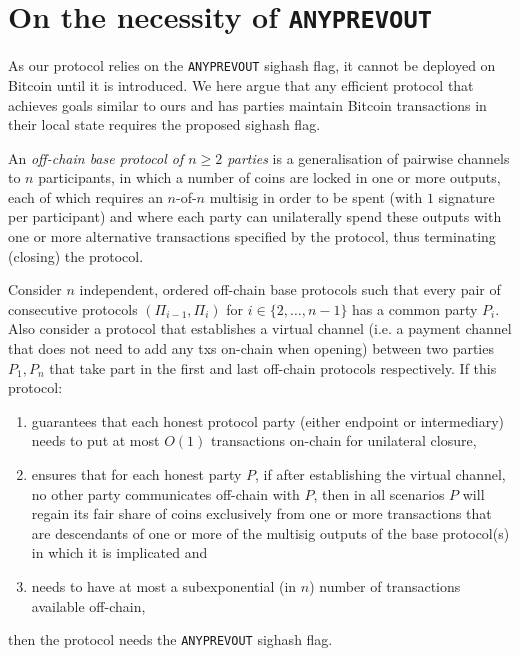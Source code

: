 \section{On the necessity of \texttt{ANYPREVOUT}}
  \label{section:anyprevout}
  As our protocol relies on the \texttt{ANYPREVOUT} sighash flag, it cannot be
  deployed on Bitcoin until it is introduced. We here argue that any efficient
  protocol that achieves goals similar to ours and has parties maintain 
  Bitcoin transactions in their local state requires  the proposed sighash flag. 

  \begin{definition}
    An \emph{off-chain base protocol of $n \geq 2$ parties} is a generalisation
    of pairwise channels to $n$ participants, in which a number of coins are
    locked in one or more outputs, each of which requires an $n$-of-$n$ multisig
    in order to be spent (with $1$ signature per participant) and where each
    party can unilaterally spend these outputs with one or more alternative
    transactions specified by the protocol, thus terminating (closing) the
    protocol.
  \end{definition}

  \begin{theorem}
    \label{theorem:anyprevout}
    Consider $n$ independent, ordered off-chain base protocols
    such that every pair of consecutive protocols $(\Pi_{i-1}, \Pi_i)$ for $i
    \in \{2, \dots, n-1\}$ has a common party $P_i$. Also consider a protocol
    that establishes a virtual channel (i.e. a payment channel that does not
    need to add any txs on-chain when opening) between two parties $P_1, P_n$
    that take part in the first and last off-chain protocols respectively. If
    this protocol:
    \begin{enumerate}
    \item guarantees that each honest protocol party (either endpoint or
    intermediary) needs to put at most $O(1)$ transactions on-chain for
    unilateral closure,
    \item ensures that for each honest party $P$, if after establishing the
    virtual channel, no other party communicates off-chain with $P$, then in all
    scenarios $P$ will regain its fair share of coins exclusively from one or
    more transactions that are descendants of one or more of the multisig
    outputs of the base protocol(s) in which it is implicated and
    \item needs to have at most a subexponential (in $n$) number of transactions
    available off-chain,
    \end{enumerate}
    then the protocol needs the \texttt{ANYPREVOUT} sighash flag.
  \end{theorem}

